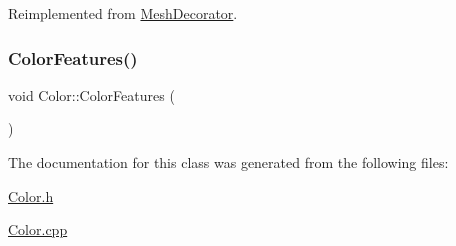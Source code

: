 Reimplemented from \mbox{\hyperlink{class_mesh_decorator_a8afe0a2ff59d5c10e8b48b2307c05e53}{Mesh\+Decorator}}.

\mbox{\label{class_color_aa5aac2f7ae26dbb9fe44a5ad691ee842}} 
\subsubsection{\texorpdfstring{ColorFeatures()}{ColorFeatures()}}
{\footnotesize\ttfamily void Color\+::\+Color\+Features (\begin{DoxyParamCaption}{ }\end{DoxyParamCaption})}



The documentation for this class was generated from the following files\+:\begin{DoxyCompactItemize}
\item 
\mbox{\hyperlink{_color_8h}{Color.\+h}}\item 
\mbox{\hyperlink{_color_8cpp}{Color.\+cpp}}\end{DoxyCompactItemize}
